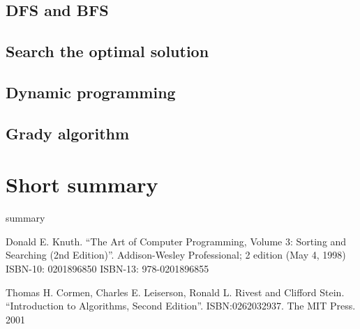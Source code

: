 \documentclass{article}
\begin{document}
\subsection{DFS and BFS}

\subsection{Search the optimal solution}

\subsection{Dynamic programming}

\subsection{Grady algorithm}

\section{Short summary} 
summary

\begin{thebibliography}{99}

Donald E. Knuth. ``The Art of Computer Programming, Volume 3: Sorting and Searching (2nd Edition)''. Addison-Wesley Professional; 2 edition (May 4, 1998) ISBN-10: 0201896850 ISBN-13: 978-0201896855

Thomas H. Cormen, Charles E. Leiserson, Ronald L. Rivest and Clifford Stein. 
``Introduction to Algorithms, Second Edition''. ISBN:0262032937. The MIT Press. 2001

\end{thebibliography}

\ifx\wholebook\relax\else
\end{document}
